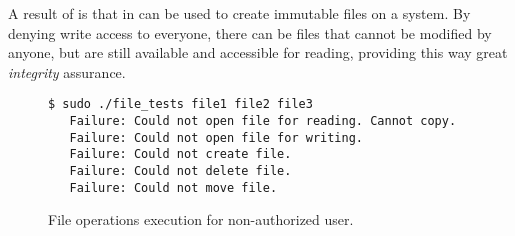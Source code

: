 \par A result of  is that in can be used to create immutable files on a system. By denying write access to everyone, there can be files that cannot be modified by anyone, but are still available and accessible for reading, providing this way great \emph{integrity} assurance.

\begin{figure}[ht]
	\centering
	\footnotesize{\selectfont 
		\begin{lstlisting}
$ sudo ./file_tests file1 file2 file3
   Failure: Could not open file for reading. Cannot copy.
   Failure: Could not open file for writing.
   Failure: Could not create file.
   Failure: Could not delete file.
   Failure: Could not move file.
		\end{lstlisting}}
	\caption{File operations execution for non-authorized user.}
	\label{fig:results2}
\end{figure}




